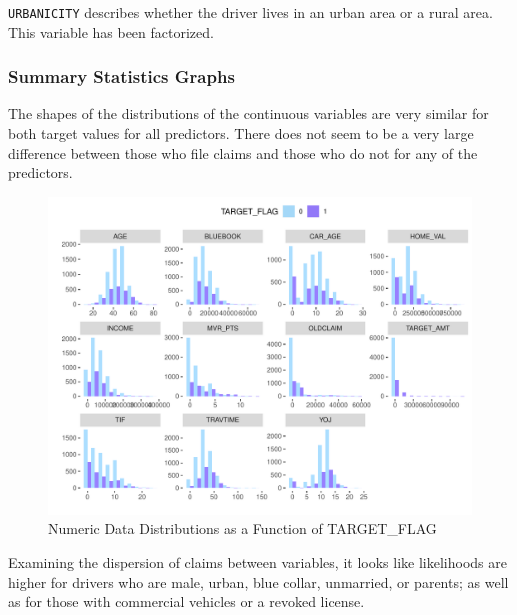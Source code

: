 \documentclass[]{article}
\begin{document}
\texttt{URBANICITY} describes whether the driver lives in an urban area
or a rural area. This variable has been factorized.

\subsubsection{Summary Statistics
Graphs}\label{summary-statistics-graphs}

The shapes of the distributions of the continuous variables are very
similar for both target values for all predictors. There does not seem
to be a very large difference between those who file claims and those
who do not for any of the predictors.

\begin{figure}
\centering
\includegraphics{proj4_files/figure-latex/f1-1.pdf}
\caption{\label{fig:f1}Numeric Data Distributions as a Function of
TARGET\_FLAG}
\end{figure}

Examining the dispersion of claims between variables, it looks like
likelihoods are higher for drivers who are male, urban, blue collar,
unmarried, or parents; as well as for those with commercial vehicles or
a revoked license.
\end{document}
